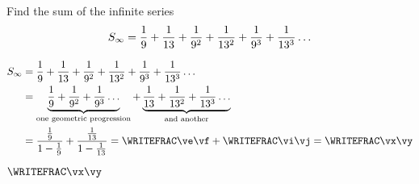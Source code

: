 

\va\vc\vd
{}\va\vc\vd\ve\vf

\vb\vg\vh
{}\vb\vg\vh\vi\vj

\FRACADD\ve\vf\vi\vj\vx\vy

\question[2] Find the sum of the infinite series 
\[S_\infty = \frac{1}{9}+\frac{1}{13}+\frac{1}{9^2} + \frac{1}{13^2} + \frac{1}{9^3} + \frac{1}{13^3} \ldots\]

\watchout

\begin{solution}[\halfpage]
	\begin{align}
		S_\infty &= \frac{1}{\va}+\frac{1}{\vb}+\frac{1}{\va^2} + \frac{1}{\vb^2} + \frac{1}{\va^3} + \frac{1}{\vb^3} \ldots \\
		  &= \underbrace{\frac{1}{\va} + \frac{1}{\va^2} + \frac{1}{\va^3}\ldots}_{\text{one geometric progression}}
		  + \underbrace{\frac{1}{\vb} + \frac{1}{\vb^2} + \frac{1}{\vb^3}\ldots}_{\text{and another}} \\
		  &= \dfrac{\frac{1}{\va}}{1-\frac{1}{\va}} + \dfrac{\frac{1}{\vb}}{1-\frac{1}{\vb}} = 
      \WRITEFRAC\ve\vf + \WRITEFRAC\vi\vj = \WRITEFRAC\vx\vy
	\end{align}
\end{solution}
\ifprintanswers\begin{codex}$\WRITEFRAC\vx\vy$\end{codex}\fi
